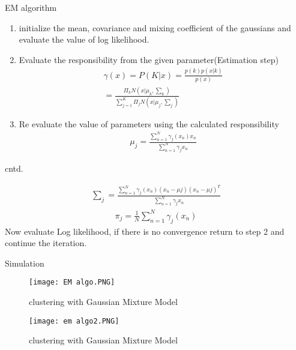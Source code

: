\documentclass{beamer}
\begin{document}
\begin{frame}{EM algorithm}
    \begin{block}{}
    \begin{enumerate}
        \item initialize the mean, covariance and mixing coefficient of the gaussians and evaluate the value of log likelihood.
        \item Evaluate the responsibility from the given parameter(Estimation step)
       \begin{align}
           \gamma(x)=P(K|x)=\frac{p(k)p(x|k)}{p(x)}\\
    =\frac{\Pi_{k}N\left(x| \mu_{k},\sum_{k}\right)}{\sum_{j=1}^{K}\Pi_{j}N\left(x| \mu_{j},\sum_{j}\right)}
       \end{align}
        \item Re evaluate the value of parameters using the calculated responsibility
        \begin{align}
            \mu_{j}=\frac{\sum_{n=1}^{N}\gamma_{j}(x_{n})x_{n}}{\sum_{n=1}^{N}\gamma_{j}x_{n}}
        \end{align}
    \end{enumerate}
   

  \end{block}
\end{frame}
\begin{frame}{cntd.}
\begin{block}{}
    \begin{align}
         \sum_{j}=\frac{\sum_{n=1}^{N}\gamma_{j}(x_{n})(x_{n}-\mu{j})(x_{n}-\mu{j})^{T}}{\sum_{n=1}^{N}\gamma_{j}x_{n}}
    \end{align}
    \begin{align}
        \pi_{j}=\frac{1}{N}\sum_{n=1}^{N}\gamma_{j}(x_{n})
    \end{align}
Now evaluate Log likelihood, if there is no convergence return to step 2 and continue the iteration.
\end{block}
    
\end{frame}
\begin{frame}{Simulation}
\begin{figure}
    \centering
    \texttt{[image: EM algo.PNG]}
    \caption{clustering with Gaussian Mixture Model}
    
    
\end{figure}

\begin{figure}
    \centering
    \texttt{[image: em algo2.PNG]}
    \caption{clustering with Gaussian Mixture Model}
    \end{figure}
\end{frame}
\end{document}
